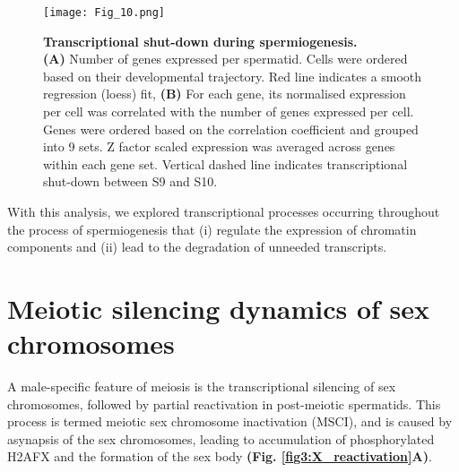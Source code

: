 \begin{figure}[!h]
\centering
\texttt{[image: Fig\_10.png]}
\caption[Transcriptional shut-down during spermiogenesis]{\textbf{Transcriptional shut-down during spermiogenesis.} \\
\textbf{(A)} Number of genes expressed per spermatid. Cells were ordered based on their developmental trajectory. Red line indicates a smooth regression (loess) fit, \textbf{(B)} For each gene, its normalised expression per cell was correlated with the number of genes expressed per cell. Genes were ordered based on the correlation coefficient and grouped into 9 sets. Z factor scaled expression was averaged across genes within each gene set. Vertical dashed line indicates transcriptional shut-down between S9 and S10.}
\label{fig3:transcriptional_shutdown}
\end{figure}

With this analysis, we explored transcriptional processes occurring throughout the process of spermiogenesis that (i) regulate the expression of chromatin components and (ii) lead to the degradation of unneeded transcripts.

\newpage

\section{Meiotic silencing dynamics of sex chromosomes}

A male-specific feature of meiosis is the transcriptional silencing of sex chromosomes, followed by partial reactivation in post-meiotic spermatids. This process is termed meiotic sex chromosome inactivation (MSCI), and is caused by asynapsis of the sex chromosomes, leading to accumulation of phosphorylated H2AFX and the formation of the sex body \citep{Hamer2003} \textbf{(Fig. \ref{fig3:X_reactivation}A)}. 

\newpage


